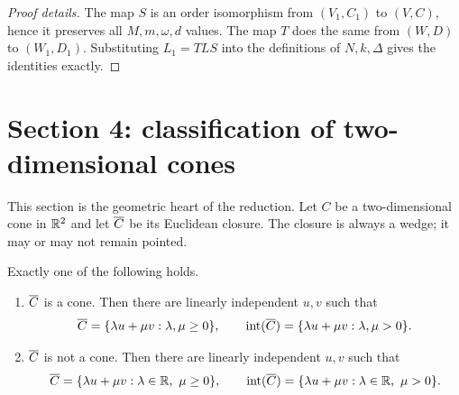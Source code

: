 \begin{proof}[Proof details]
The map $S$ is an order isomorphism from $(V_1,C_1)$ to $(V,C)$, hence it preserves all $M,m,\omega,d$ values.
The map $T$ does the same from $(W,D)$ to $(W_1,D_1)$.
Substituting $L_1=TLS$ into the definitions of $N,k,\Delta$ gives the identities exactly.
\end{proof}

\section{Section 4: classification of two-dimensional cones}

This section is the geometric heart of the reduction.
Let $C$ be a two-dimensional cone in $\mathbb{R}^2$ and let $\overline{C}$ be its Euclidean closure.
The closure is always a wedge; it may or may not remain pointed.

\begin{theorem}
Exactly one of the following holds.
\begin{enumerate}[label=(\arabic*)]
\item $\overline{C}$ is a cone.  Then there are linearly independent $u,v$ such that
\[
  \overline{C}=\{\lambda u+\mu v:\lambda,\mu\ge0\},
  \qquad
  \operatorname{int}(\overline{C})=\{\lambda u+\mu v:\lambda,\mu>0\}.
\]
\item $\overline{C}$ is not a cone.  Then there are linearly independent $u,v$ such that
\[
  \clos C=\{\lambda u+\mu v:\lambda\in\R,\ \mu\ge0\},
  \qquad
  \intopn(\clos C)=\{\lambda u+\mu v:\lambda\in\R,\ \mu>0\}.
\]
\end{enumerate}
\end{theorem}

